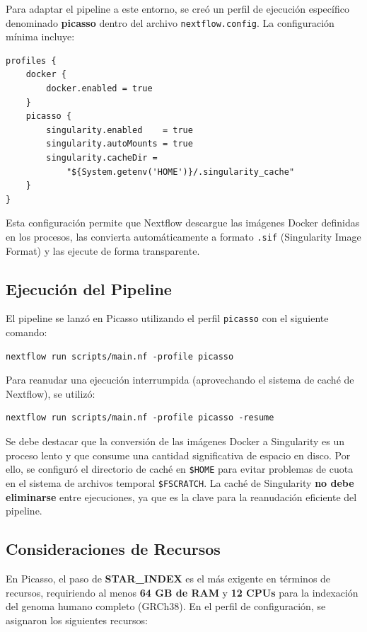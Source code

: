 \documentclass[11pt,a4paper]{article}
\begin{document}
Para adaptar el pipeline a este entorno, se creó un perfil de ejecución específico denominado \textbf{picasso} dentro del archivo \texttt{nextflow.config}. La configuración mínima incluye:

\begin{verbatim}
profiles {
    docker {
        docker.enabled = true
    }
    picasso {
        singularity.enabled    = true
        singularity.autoMounts = true
        singularity.cacheDir = 
            "${System.getenv('HOME')}/.singularity_cache"
    }
}
\end{verbatim}

Esta configuración permite que Nextflow descargue las imágenes Docker definidas en los procesos, las convierta automáticamente a formato \texttt{.sif} (Singularity Image Format) y las ejecute de forma transparente.

\subsection{Ejecución del Pipeline}

El pipeline se lanzó en Picasso utilizando el perfil \texttt{picasso} con el siguiente comando:

\begin{verbatim}
nextflow run scripts/main.nf -profile picasso
\end{verbatim}

Para reanudar una ejecución interrumpida (aprovechando el sistema de caché de Nextflow), se utilizó:

\begin{verbatim}
nextflow run scripts/main.nf -profile picasso -resume
\end{verbatim}

Se debe destacar que la conversión de las imágenes Docker a Singularity es un proceso lento y que consume una cantidad significativa de espacio en disco. Por ello, se configuró el directorio de caché en \texttt{\$HOME} para evitar problemas de cuota en el sistema de archivos temporal \texttt{\$FSCRATCH}. La caché de Singularity \textbf{no debe eliminarse} entre ejecuciones, ya que es la clave para la reanudación eficiente del pipeline.

\subsection{Consideraciones de Recursos}

En Picasso, el paso de \textbf{STAR\_INDEX} es el más exigente en términos de recursos, requiriendo al menos \textbf{64 GB de RAM} y \textbf{12 CPUs} para la indexación del genoma humano completo (GRCh38). En el perfil de configuración, se asignaron los siguientes recursos:
\end{document}
